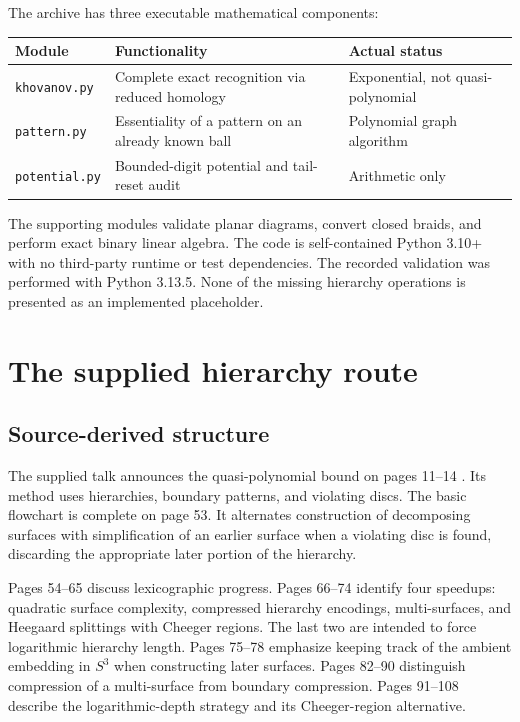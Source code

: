 \documentclass[11pt]{article}
\theoremstyle{definition}
\newcommand{\code}[1]{\texttt{#1}}
\begin{document}
The archive has three executable mathematical components:
\begin{center}
\begin{tabular}{@{}p{}p{}p{}@{}}
\toprule
Module & Functionality & Actual status \\
\midrule
\code{khovanov.py} & Complete exact recognition via reduced homology &
Exponential, not quasi-polynomial \\
\code{pattern.py} & Essentiality of a pattern on an already known ball &
Polynomial graph algorithm \\
\code{potential.py} & Bounded-digit potential and tail-reset audit &
Arithmetic only \\
\bottomrule
\end{tabular}
\end{center}
The supporting modules validate planar diagrams, convert closed braids, and
perform exact binary linear algebra. The code is self-contained Python 3.10+
with no third-party runtime or test dependencies. The recorded validation was
performed with Python 3.13.5. None of the missing hierarchy operations is
presented as an implemented placeholder.

\section{The supplied hierarchy route}
\subsection{Source-derived structure}
The supplied talk announces the quasi-polynomial bound on pages 11--14
\cite{slides}. Its method uses hierarchies, boundary patterns, and violating
discs. The basic flowchart is complete on page 53. It alternates construction
of decomposing surfaces with simplification of an earlier surface when a
violating disc is found, discarding the appropriate later portion of the
hierarchy.

Pages 54--65 discuss lexicographic progress. Pages 66--74 identify four
speedups: quadratic surface complexity, compressed hierarchy encodings,
multi-surfaces, and Heegaard splittings with Cheeger regions. The last two are
intended to force logarithmic hierarchy length. Pages 75--78 emphasize keeping
track of the ambient embedding in $S^3$ when constructing later surfaces.
Pages 82--90 distinguish compression of a multi-surface from boundary
compression. Pages 91--108 describe the logarithmic-depth strategy and its
Cheeger-region alternative.
\end{document}
